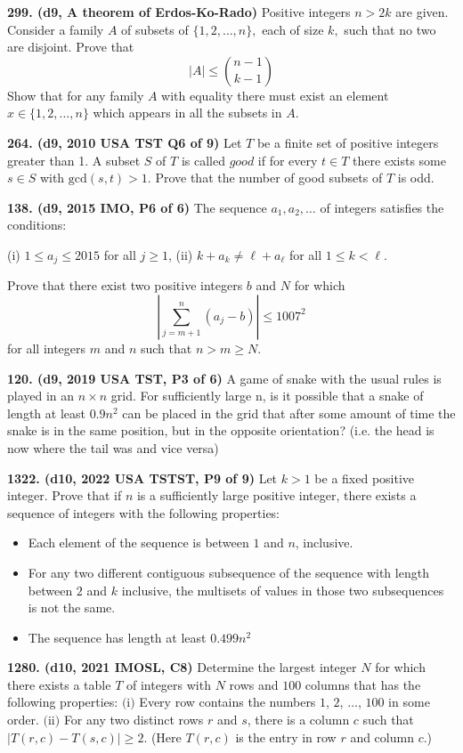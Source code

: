 \documentclass{article}
\begin{document}
\textbf{299. (\color{red}d9\color{black}, A theorem of Erdos-Ko-Rado)} Positive integers $n > 2k$ are given. Consider a family $A$ of subsets of $\{1, 2, \dots, n\},$ each of size $k,$ such that no two are disjoint. Prove that $$\lvert A \rvert \leq \binom{n - 1}{k - 1}$$ Show that for any family $A$ with equality there must exist an element $x \in \{1, 2, \dots, n\}$ which appears in all the subsets in $A.$

\textbf{264. (\color{red}d9\color{black}, 2010 USA TST Q6 of 9)} Let $T$ be a finite set of positive integers greater than 1. A subset $S$ of $T$ is called $\textit{good}$ if for every $t \in T$ there exists some $s \in S$ with $\text{gcd}(s, t) > 1.$ Prove that the number of good subsets of $T$ is odd.

\textbf{138. (\color{red}d9\color{black}, 2015 IMO, P6 of 6)} The sequence $a_1,a_2,\dots$ of integers satisfies the conditions:

(i) $1\le a_j\le2015$ for all $j\ge1$,
(ii) $k+a_k\neq \ell+a_\ell$ for all $1\le k<\ell$.

Prove that there exist two positive integers $b$ and $N$ for which\[\left\vert\sum_{j=m+1}^n(a_j-b)\right\vert\le1007^2\]for all integers $m$ and $n$ such that $n>m\ge N$.

\textbf{120. (\color{red}d9\color{black}, 2019 USA TST, P3 of 6)} A game of snake with the usual rules is played in an $n \times n$ grid. For sufficiently large n, is it possible that a snake of length at least $0.9n^2$ can be placed in the grid that after some amount of time the snake is in the same position, but in the opposite orientation? (i.e. the head is now where the tail was and vice versa)

\textbf{1322. (\color{red}d10\color{black}, 2022 USA TSTST, P9 of 9)} Let $k>1$ be a fixed positive integer. Prove that if $n$ is a sufficiently large positive integer, there exists a sequence of integers with the following properties:
\begin{itemize}
        \item Each element of the sequence is between $1$ and $n$, inclusive.
        \item For any two different contiguous subsequence of the sequence with length between $2$ and $k$ inclusive, the multisets of values in those two subsequences is not the same.
        \item The sequence has length at least $0.499n^2$
\end{itemize}

\textbf{1280. (\color{red}d10\color{black}, 2021 IMOSL, C8)} Determine the largest integer $N$ for which there exists a table $T$ of integers with $N$ rows and $100$ columns that has the following properties:
$\text{(i)}$ Every row contains the numbers $1$, $2$, $\ldots$, $100$ in some order.
$\text{(ii)}$ For any two distinct rows $r$ and $s$, there is a column $c$ such that $|T(r,c) - T(s, c)|\geq 2$. (Here $T(r,c)$ is the entry in row $r$ and column $c$.)
\end{document}
